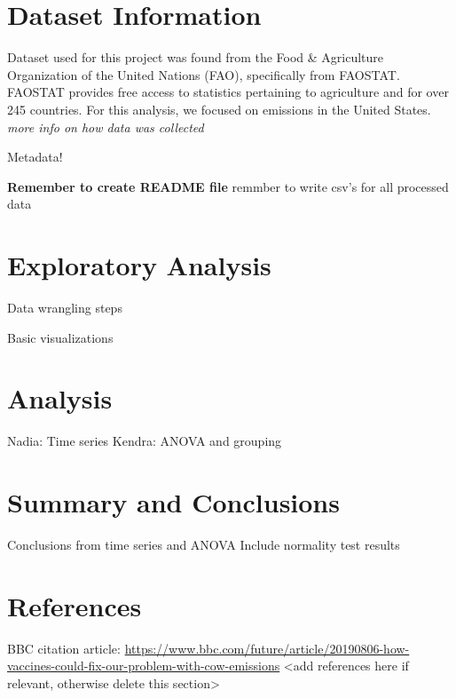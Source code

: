 \documentclass[
  12pt,
]{article}
\begin{document}
\newpage

\hypertarget{dataset-information}{%
\section{Dataset Information}\label{dataset-information}}

Dataset used for this project was found from the Food \& Agriculture
Organization of the United Nations (FAO), specifically from FAOSTAT.
FAOSTAT provides free access to statistics pertaining to agriculture and
for over 245 countries. For this analysis, we focused on emissions in
the United States. \emph{more info on how data was collected}

Metadata!

\textbf{Remember to create README file }remmber to write csv's for all
processed data

\newpage

\hypertarget{exploratory-analysis}{%
\section{Exploratory Analysis}\label{exploratory-analysis}}

Data wrangling steps

Basic visualizations

\newpage

\hypertarget{analysis}{%
\section{Analysis}\label{analysis}}

Nadia: Time series Kendra: ANOVA and grouping

\newpage

\hypertarget{summary-and-conclusions}{%
\section{Summary and Conclusions}\label{summary-and-conclusions}}

Conclusions from time series and ANOVA Include normality test results

\newpage

\hypertarget{references}{%
\section{References}\label{references}}

BBC citation article:
\url{https://www.bbc.com/future/article/20190806-how-vaccines-could-fix-our-problem-with-cow-emissions}
\textless add references here if relevant, otherwise delete this
section\textgreater{}
\end{document}
